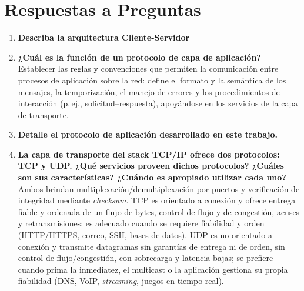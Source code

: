\section{Respuestas a Preguntas}
\begin{enumerate} 
  \item \textbf{Describa la arquitectura Cliente-Servidor}
  \item \textbf{¿Cuál es la función de un protocolo de capa de aplicación?}\\
  Establecer las reglas y convenciones que permiten la comunicación entre procesos de aplicación sobre la red: define el formato y la semántica de los mensajes, la temporización, el manejo de errores y los procedimientos de interacción (p.\,ej., solicitud–respuesta), apoyándose en los servicios de la capa de transporte.
  \item \textbf{Detalle el protocolo de aplicación desarrollado en este trabajo.}
  \item \textbf{La capa de transporte del stack TCP/IP ofrece dos protocolos: TCP y UDP. ¿Qué servicios proveen dichos protocolos? ¿Cuáles son sus características? ¿Cuándo es apropiado utilizar cada uno?}\\
  Ambos brindan multiplexación/demultiplexación por puertos y verificación de integridad mediante \emph{checksum}. TCP es orientado a conexión y ofrece entrega fiable y ordenada de un flujo de bytes, control de flujo y de congestión, acuses y retransmisiones; es adecuado cuando se requiere fiabilidad y orden (HTTP/HTTPS, correo, SSH, bases de datos). UDP es no orientado a conexión y transmite datagramas sin garantías de entrega ni de orden, sin control de flujo/congestión, con sobrecarga y latencia bajas; se prefiere cuando prima la inmediatez, el multicast o la aplicación gestiona su propia fiabilidad (DNS, VoIP, \emph{streaming}, juegos en tiempo real).
\end{enumerate}
